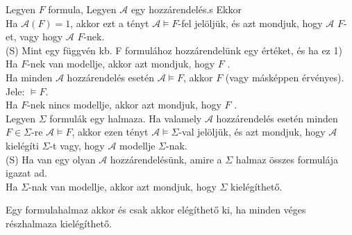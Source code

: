 \begin{frame}

\begin{tcolorbox}[squeezed title={Formula modellje, Kielégíthető, Tautológia, Kielégíthetetlen}]
Legyen $F$ formula, Legyen $\mathcal{A}$ egy hozzárendelés.s Ekkor\\
\mbigskip
Ha $\mathcal{A}(F) = 1$, akkor ezt a tényt $\mathcal{A} \models F$-fel jelöljük, és azt mondjuk, hogy $\mathcal{A}$  $F$-et, vagy hogy $\mathcal{A}$ \underline{} $F$-nek.\\
{\tiny (S) Mint egy függvén kb. F formulához hozzárendelünk egy értéket, és ha ez 1)}\\
\mbigskip
Ha $F$-nek van modellje, akkor azt mondjuk, hogy $F$ \underline{}.\\
\mbigskip
Ha minden $\mathcal{A}$ hozzárendelés esetén $\mathcal{A} \models F$, akkor $F$ \underline{} (vagy másképpen érvényes).\\
Jele: $\models F$.\\
\mbigskip
Ha $F$-nek nincs modellje, akkor azt mondjuk, hogy $F$ \underline{}.\\
\mbigskip
Legyen $\Sigma$ formulák egy halmaza. Ha valamely $\mathcal{A}$ hozzárendelés esetén minden $F \in \Sigma$-re $\mathcal{A} \models F$, akkor ezen tényt $\mathcal{A} \models \Sigma$-val jelöljük, és azt mondjuk, hogy $\mathcal{A}$ kielégíti $\Sigma$-t vagy, hogy $\mathcal{A}$ modellje $\Sigma$-nak.\\
{\tiny (S) Ha van egy olyan $\mathcal{A}$ hozzárendelésünk, amire a $\Sigma$ halmaz összes formulája igazat ad.}\\
\mbigskip
Ha $\Sigma$-nak van modellje, akkor azt mondjuk, hogy $\Sigma$ kielégíthető.
\end{tcolorbox}
\end{frame}

\begin{frame}
\begin{tcolorbox}[title={Tétel: Az ítéletkalkulus kompaktsági tétele}]
Egy formulahalmaz akkor és csak akkor elégíthető ki, ha minden véges részhalmaza kielégíthető.
\end{tcolorbox}
\end{frame}

